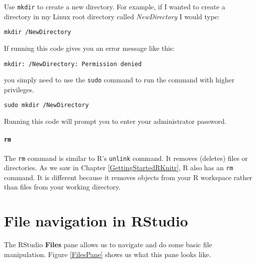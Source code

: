 Use \texttt{mkdir} to create a new directory. For example, if I wanted to create a directory in my Linux root directory called {\emph{NewDirectory}} I would type:

\begin{knitrout}
\color{fgcolor}\begin{kframe}
\begin{verbatim}
mkdir /NewDirectory
\end{verbatim}
\end{kframe}
\end{knitrout}


\noindent If running this code gives you an error message like this:

\begin{knitrout}
\color{fgcolor}\begin{kframe}
\begin{verbatim}
mkdir: /NewDirectory: Permission denied
\end{verbatim}
\end{kframe}
\end{knitrout}


\noindent you simply need to use the \texttt{sudo} command to run the command with higher privileges. 

\begin{knitrout}
\color{fgcolor}\begin{kframe}
\begin{verbatim}
sudo mkdir /NewDirectory
\end{verbatim}
\end{kframe}
\end{knitrout}


\noindent Running this code will prompt you to enter your administrator password.

\paragraph{{\tt{rm}}}

The {\tt{rm}} command is similar to R's {\tt{unlink}} command. It removes (deletes) files or directories. As we saw in Chapter \ref{GettingStartedRKnitr}, R also has an \texttt{rm} command. It is different because it removes objects from your R workspace rather than files from your working directory.

\section{File navigation in RStudio}

The RStudio {\bf{Files}} pane allows us to navigate and do some basic file manipulation. Figure \ref{FilesPane} shows us what this pane looks like.

